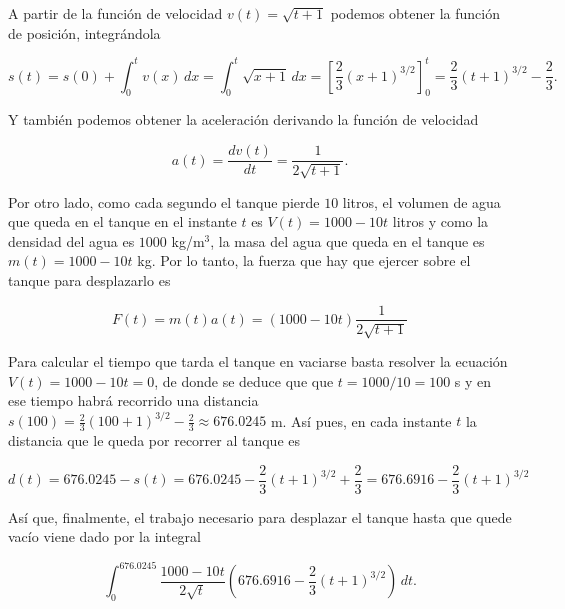 \documentclass[
  spanish,
  a4paper,
]{scrreport}
\theoremstyle{definition}
\theoremstyle{remark}
\begin{document}
\begin{tcolorbox}[enhanced jigsaw, arc=.35mm, bottomrule=.15mm, bottomtitle=1mm, breakable, colback=white, colbacktitle=quarto-callout-tip-color!10!white, colframe=quarto-callout-tip-color-frame, coltitle=black, left=2mm, leftrule=.75mm, opacityback=0, opacitybacktitle=0.6, rightrule=.15mm, title=\textcolor{quarto-callout-tip-color}{\faLightbulb}\hspace{0.5em}{Solución}, titlerule=0mm, toprule=.15mm, toptitle=1mm]

A partir de la función de velocidad \(v(t) = \sqrt{t+1}\) podemos
obtener la función de posición, integrándola

\[
s(t) 
= s(0) + \int_0^t v(x)\,dx
= \int_0^t \sqrt{x+1}\,dx
= \left[\frac{2}{3}(x+1)^{3/2}\right]_0^t
= \frac{2}{3}(t+1)^{3/2} - \frac{2}{3}.
\]

Y también podemos obtener la aceleración derivando la función de
velocidad

\[
a(t)
= \frac{dv(t)}{dt}
= \frac{1}{2\sqrt{t+1}}.
\]

Por otro lado, como cada segundo el tanque pierde \(10\) litros, el
volumen de agua que queda en el tanque en el instante \(t\) es
\(V(t) = 1000 - 10t\) litros y como la densidad del agua es \(1000\)
kg/m\(^3\), la masa del agua que queda en el tanque es
\(m(t) = 1000 - 10t\) kg. Por lo tanto, la fuerza que hay que ejercer
sobre el tanque para desplazarlo es

\[
F(t) = m(t)a(t) = (1000 - 10t)\frac{1}{2\sqrt{t+1}}
\]

Para calcular el tiempo que tarda el tanque en vaciarse basta resolver
la ecuación \(V(t)=1000-10t = 0\), de donde se deduce que que
\(t=1000/10=100\) s y en ese tiempo habrá recorrido una distancia
\(s(100) = \frac{2}{3}(100+1)^{3/2} - \frac{2}{3} \approx 676.0245\) m.
Así pues, en cada instante \(t\) la distancia que le queda por recorrer
al tanque es

\[
d(t) 
= 676.0245 - s(t)
= 676.0245 - \frac{2}{3}(t+1)^{3/2} + \frac{2}{3}
= 676.6916 - \frac{2}{3}(t+1)^{3/2}
\]

Así que, finalmente, el trabajo necesario para desplazar el tanque hasta
que quede vacío viene dado por la integral

\[
\int_0^{676.0245} \frac{1000-10t}{2\sqrt{t}} (676.6916 - \frac{2}{3}(t+1)^{3/2})\,dt.
\]

\end{tcolorbox}

\end{document}
